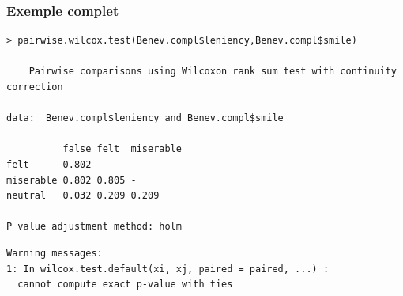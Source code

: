 \documentclass[12pt,t]{beamer}
\theoremstyle{plain}
\theoremstyle{definition}
\begin{document}
\begin{frame}[fragile]
\frametitle{Exemple complet}\vspace*{-1ex}

\begin{lstlisting}
> pairwise.wilcox.test(Benev.compl$leniency,Benev.compl$smile) 

	Pairwise comparisons using Wilcoxon rank sum test with continuity correction 

data:  Benev.compl$leniency and Benev.compl$smile 

          false felt  miserable
felt      0.802 -     -        
miserable 0.802 0.805 -        
neutral   0.032 0.209 0.209    

P value adjustment method: holm 
\end{lstlisting}\vspace{-1.4ex}

\begin{lstlisting}[style=warning]
Warning messages:
1: In wilcox.test.default(xi, xj, paired = paired, ...) :
  cannot compute exact p-value with ties
\end{lstlisting}
\end{frame}
\end{document}
